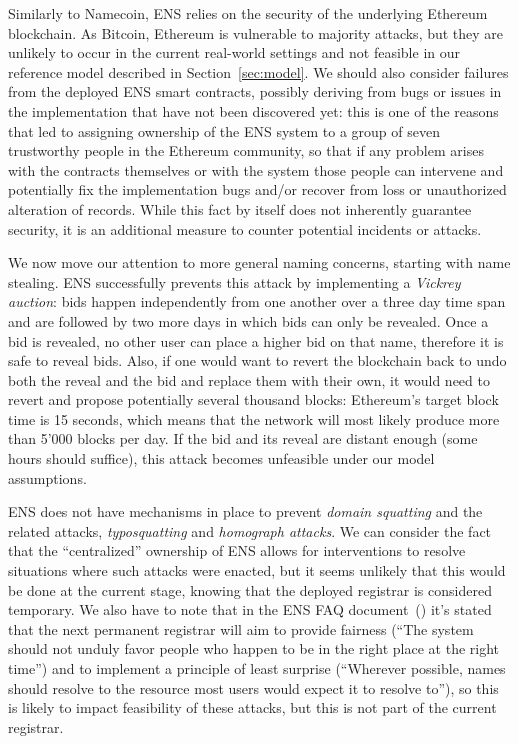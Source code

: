 \documentclass[mscthesis]{usiinfthesis}
\begin{document}
Similarly to Namecoin, ENS relies on the security of the underlying Ethereum blockchain. As Bitcoin, Ethereum is vulnerable to majority attacks, but they are unlikely to occur in the current real-world settings and not feasible in our reference model described in Section~\ref{sec:model}.
We should also consider failures from the deployed ENS smart contracts, possibly deriving from bugs or issues in the implementation that have not been discovered yet: this is one of the reasons that led to assigning ownership of the ENS system to a group of seven trustworthy people in the Ethereum community, so that if any problem arises with the contracts themselves or with the system those people can intervene and potentially fix the implementation bugs and/or recover from loss or unauthorized alteration of records. While this fact by itself does not inherently guarantee security, it is an additional measure to counter potential incidents or attacks.

We now move our attention to more general naming concerns, starting with name stealing. ENS successfully prevents this attack by implementing a \emph{Vickrey auction}: bids happen independently from one another over a three day time span and are followed by two more days in which bids can only be revealed. Once a bid is revealed, no other user can place a higher bid on that name, therefore it is safe to reveal bids. Also, if one would want to revert the blockchain back to undo both the reveal and the bid and replace them with their own, it would need to revert and propose potentially several thousand blocks: Ethereum's target block time is 15 seconds, which means that the network will most likely produce more than 5'000 blocks per day. If the bid and its reveal are distant enough (some hours should suffice), this attack becomes unfeasible under our model assumptions.

ENS does not have mechanisms in place to prevent \emph{domain squatting} and the related attacks, \emph{typosquatting} and \emph{homograph attacks}. We can consider the fact that the ``centralized'' ownership of ENS allows for interventions to resolve situations where such attacks were enacted, but it seems unlikely that this would be done at the current stage, knowing that the deployed registrar is considered temporary. We also have to note that in the ENS FAQ document~(\cite{website:ensfaq}) it's stated that the next permanent registrar will aim to provide fairness (``The system should not unduly favor people who happen to be in the right place at the right time'') and to implement a principle of least surprise (``Wherever possible, names should resolve to the resource most users would expect it to resolve to''), so this is likely to impact feasibility of these attacks, but this is not part of the current registrar.
\end{document}
